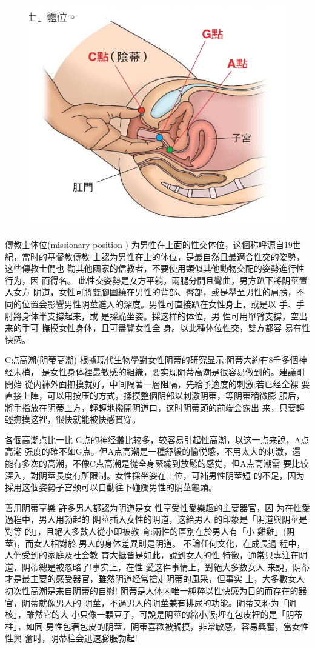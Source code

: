 \documentclass[12pt,UTF8]{ctexbook}
\begin{document}
\begin{figure}[htbp]
	\centering
	\includegraphics[width=0.7\linewidth]{16}
	\caption{}
	\label{fig:1}
\end{figure}

傳教士体位(missionary position )
为男性在上面的性交体位，这個称呼源自19世紀，當时的基督教傳教
士認为男性在上的体位，是最自然且最適合性交的姿勢，这些傳教士們也
勸其他國家的信教者，不要使用類似其他動物交配的姿勢進行性行为，因
而得名。
此性交姿勢是女方平躺，兩腿分開且彎曲，男方趴下將阴莖置入女方
阴道，女性可將雙腳圍繞在男性的背部、臀部，或是舉至男性的肩膀，不
同的位置会影響男性阴莖進入的深度。男性可直接趴在女性身上，或是以
手、手肘將身体半支撐起来，或
是採跪坐姿。採这样的体位，男
性可用單臂支撐，空出来的手可
撫摸女性身体，且可盡覽女性全
身。以此種体位性交，雙方都容
易有性快感。

C点高潮(阴蒂高潮)
根據现代生物學對女性阴蒂的研究显示:阴蒂大約有8千多個神经末梢，
是女性身体裡最敏感的組織，要实现阴蒂高潮是很容易做到的。建議剛開始
從内褲外面撫摸就好，中间隔著一層阻隔，先給予適度的刺激;若已经全裸
要直接上陣，可以用按压的方式，揉摸整個阴部以刺激阴蒂，等阴蒂稍微膨
脹后，將手指放在阴蒂上方，輕輕地撥開阴道口，这时阴蒂頭的前端会露出
来，只要輕輕撫摸这裡，很快就能被快感貫穿。

各個高潮点比一比
G点的神经叢比较多，较容易引起性高潮，以这一点来說，A点高潮
强度的確不如G点。但A点高潮是一種舒緩的愉悦感，不用太大的刺激，還
能有多次的高潮，不像C点高潮是從全身緊繃到放鬆的感觉，但A点高潮需
要比较深入，對阴莖長度有所限制。女性採坐姿在上位，可補男性阴莖短
的不足，因为採用这個姿勢子宫颈可以自動往下碰觸男性的阴莖龜頭。

善用阴蒂享樂
許多男人都認为阴道是女
性享受性愛樂趣的主要器官，因
为在性愛過程中，男人用勃起的
阴莖插入女性的阴道，这給男人
的印象是「阴道與阴莖是對等
的」，且絕大多數人從小即被教
育:兩性的區別在於男人有「小
雞雞」(阴莖)，而女人相對於
男人的身体差異則是阴道。
不論任何文化，在成長過
程中，人們受到的家庭及社会教
育大抵皆是如此，說到女人的性
特徵，通常只專注在阴道，阴蒂總是被忽略了!事实上，在性
愛这件事情上，對絕大多數女人
来說，阴蒂才是最主要的感受器官，雖然阴道经常搶走阴蒂的風采，但事实
上，大多數女人初次性高潮是来自阴蒂的自慰!
阴蒂是人体内唯一純粹以性快感为目的而存在的器官，阴蒂就像男人的
阴莖，不過男人的阴莖兼有排尿的功能。阴蒂又称为「阴核」，雖然它的大
小只像一顆豆子，可說是阴莖的縮小版;埋在包皮裡的是「阴蒂柱」，如同
男性包著包皮的阴莖，阴蒂喜歡被觸摸，非常敏感，容易興奮，當女性性興
奮时，阴蒂柱会迅速膨脹勃起!
\end{document}

